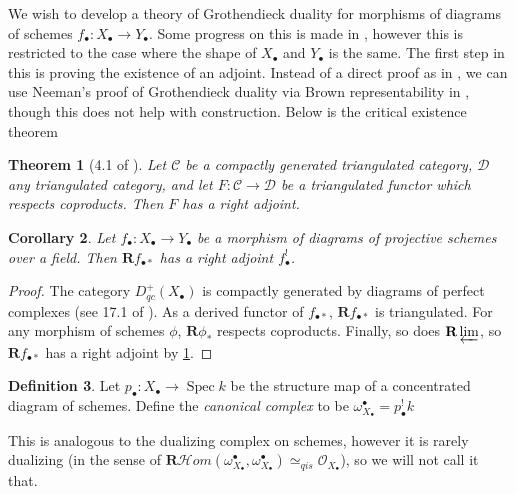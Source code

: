 \documentclass[proquest]{uwthesis}[2014/11/13]
\newtheorem{theorem}{Theorem}[section]
\newtheorem{cor}[theorem]{Corollary}
\theoremstyle{definition}
\newtheorem{definition}[theorem]{Definition}
\newcommand{\cHom}{\mathcal{H} \textit{om}}
\DeclareMathOperator{\Spec}{Spec}
\newcommand{\CL}{\mathcal{C}}
\newcommand{\DD}{\mathcal{D}}
\newcommand{\OO}{\mathcal{O}}
\newcommand{\qis}{\simeq_{qis}}
\newcommand{\bR}{\textbf{R}}
\begin{document}
We wish to develop a theory of Grothendieck duality for morphisms of diagrams of schemes $f_\bullet : X_\bullet \rightarrow Y_\bullet$.
Some progress on this is made in \cite{Lipman2009}, however this is restricted to the case where the shape of $X_\bullet$ and $Y_\bullet$ is the same.
The first step in this is proving the existence of an adjoint.
Instead of a direct proof as in \cite{Hartshorne1966}, we can use Neeman's proof of Grothendieck duality via Brown representability in \cite{Neeman1996}, though this does not help with construction.
Below is the critical existence theorem

\begin{theorem}[4.1 of \cite{Neeman1996}]
	\label{thm:neeman4.1}
	Let $\CL$ be a compactly generated triangulated category, $\DD$ any triangulated category, and let $F : \CL \rightarrow \DD$ be a triangulated functor which respects coproducts.
	Then $F$ has a right adjoint.
\end{theorem}

\begin{cor}
	Let $f_\bullet : X_\bullet \rightarrow Y_\bullet$ be a morphism of diagrams of projective schemes over a field.
	Then $\bR f_{\bullet *}$ has a right adjoint $f^!_\bullet$.
\end{cor}
\begin{proof}
	The category $D_{qc}^+(X_\bullet)$ is compactly generated by diagrams of perfect complexes (see 17.1 of \cite{Lipman2009}).
	As a derived functor of $f_{\bullet *}$, $\bR f_{\bullet *}$ is triangulated.
	For any morphism of schemes $\phi$, $\bR \phi_*$ respects coproducts.
	Finally, so does $\bR \varprojlim$, so $\bR f_{\bullet *}$ has a right adjoint by \ref{thm:neeman4.1}.
\end{proof}

\begin{definition}
	Let $p_\bullet : X_\bullet \rightarrow \Spec k$ be the structure map of a concentrated diagram of schemes.
	Define the \textit{canonical complex} to be $\omega_{X_\bullet}^\bullet = p_\bullet^! k$
\end{definition}

This is analogous to the dualizing complex on schemes, however it is rarely dualizing (in the sense of $\bR \cHom(\omega_{X_\bullet}^\bullet, \omega_{X_\bullet}^\bullet) \qis \OO_{X_\bullet}$), so we will not call it that.
\end{document}
